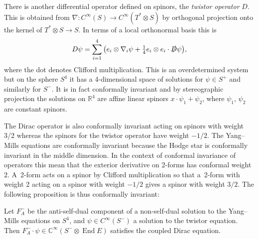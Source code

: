 \documentclass[pdftex]{sigma}
\def\End{\operatorname{End}}
\newcommand{\R}{\mathbb{R}}
\newcommand{\C}{\mathbb{C}}
\begin{document}
There is another differential operator defined on spinors, the {\it twistor operator} $D$. This is obtained from $\nabla\colon C^{\infty}(S)\rightarrow C^{\infty}(T^*\otimes S)$ by orthogonal projection onto the kernel of $T^*\otimes S\rightarrow S$. In terms of a local orthonormal basis this is
\begin{displaymath}
D\psi=\sum_{i=1}^4 \big(e_i\otimes \nabla_i\psi +\tfrac{1}{4}e_i\otimes e_i\cdot \slashed D\psi\big),
\end{displaymath}
where the dot denotes Clifford multiplication.
This is an overdetermined system but on the sphere $S^4$ it has a 4-dimensional space of solutions for $\psi\in S^+$ and similarly for $S^-$. It is in fact conformally invariant and by stereographic projection the solutions on $\R^4$ are affine linear spinors $x\cdot \psi_1+\psi_2$, where $\psi_1$, $\psi_2$ are constant spinors.

The Dirac operator is also conformally invariant acting on spinors with weight 3/2 \cite{Hitchin1} whereas the spinors for the twistor operator have weight $-1/2$. The Yang--Mills equations are conformally invariant because the Hodge star is conformally invariant in the middle dimension. In the context of conformal invariance of operators this mean that the exterior derivative on 2-forms has conformal weight~$2$. A~2-form acts on a spinor by Clifford multiplication so that a~2-form with weight 2 acting on a spinor with weight $-1/2$ gives a spinor with weight $3/2$. The following proposition is thus conformally invariant:

\begin{proposition}\samepage Let $F_A^-$ be the anti-self-dual component of a non-self-dual solution to the Yang--Mills equations on $S^4$, and $\psi\in C^{\infty}(S^-)$ a solution to the twistor equation. Then $F_A^-\cdot \psi\in \C^{\infty}( S^-\otimes \End E)$ satisfies the coupled Dirac equation.
\end{proposition}
\end{document}
